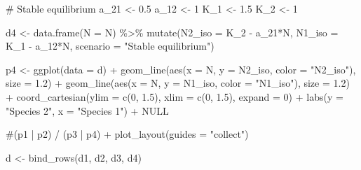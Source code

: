 \documentclass[
  letterpaper,
  DIV=11,
  numbers=noendperiod]{scrartcl}
\newenvironment{Shaded}{\begin{snugshade}}{\end{snugshade}}
\newcommand{\AttributeTok}[1]{\textcolor[rgb]{0.40,0.45,0.13}{#1}}
\newcommand{\CommentTok}[1]{\textcolor[rgb]{0.37,0.37,0.37}{#1}}
\newcommand{\ConstantTok}[1]{\textcolor[rgb]{0.56,0.35,0.01}{#1}}
\newcommand{\DecValTok}[1]{\textcolor[rgb]{0.68,0.00,0.00}{#1}}
\newcommand{\FloatTok}[1]{\textcolor[rgb]{0.68,0.00,0.00}{#1}}
\newcommand{\FunctionTok}[1]{\textcolor[rgb]{0.28,0.35,0.67}{#1}}
\newcommand{\NormalTok}[1]{\textcolor[rgb]{0.00,0.23,0.31}{#1}}
\newcommand{\OtherTok}[1]{\textcolor[rgb]{0.00,0.23,0.31}{#1}}
\newcommand{\SpecialCharTok}[1]{\textcolor[rgb]{0.37,0.37,0.37}{#1}}
\newcommand{\StringTok}[1]{\textcolor[rgb]{0.13,0.47,0.30}{#1}}
\begin{document}
\begin{Shaded}
\begin{Highlighting}[]
\CommentTok{\# Stable equilibrium}
\NormalTok{a\_21 }\OtherTok{\textless{}{-}} \FloatTok{0.5}
\NormalTok{a\_12 }\OtherTok{\textless{}{-}} \DecValTok{1}
\NormalTok{K\_1 }\OtherTok{\textless{}{-}} \FloatTok{1.5}
\NormalTok{K\_2 }\OtherTok{\textless{}{-}} \DecValTok{1}

\NormalTok{d4 }\OtherTok{\textless{}{-}} \FunctionTok{data.frame}\NormalTok{(}\AttributeTok{N =}\NormalTok{ N) }\SpecialCharTok{\%\textgreater{}\%} 
  \FunctionTok{mutate}\NormalTok{(}\AttributeTok{N2\_iso =}\NormalTok{ K\_2 }\SpecialCharTok{{-}}\NormalTok{ a\_21}\SpecialCharTok{*}\NormalTok{N,}
         \AttributeTok{N1\_iso =}\NormalTok{ K\_1 }\SpecialCharTok{{-}}\NormalTok{ a\_12}\SpecialCharTok{*}\NormalTok{N,}
         \AttributeTok{scenario =} \StringTok{"Stable equilibrium"}\NormalTok{)}

\NormalTok{p4 }\OtherTok{\textless{}{-}} \FunctionTok{ggplot}\NormalTok{(}\AttributeTok{data =}\NormalTok{ d) }\SpecialCharTok{+}
  \FunctionTok{geom\_line}\NormalTok{(}\FunctionTok{aes}\NormalTok{(}\AttributeTok{x =}\NormalTok{ N, }\AttributeTok{y =}\NormalTok{ N2\_iso, }\AttributeTok{color =} \StringTok{"N2\_iso"}\NormalTok{), }\AttributeTok{size =} \FloatTok{1.2}\NormalTok{) }\SpecialCharTok{+}
  \FunctionTok{geom\_line}\NormalTok{(}\FunctionTok{aes}\NormalTok{(}\AttributeTok{x =}\NormalTok{ N, }\AttributeTok{y =}\NormalTok{ N1\_iso, }\AttributeTok{color =} \StringTok{"N1\_iso"}\NormalTok{), }\AttributeTok{size =} \FloatTok{1.2}\NormalTok{) }\SpecialCharTok{+}
  \FunctionTok{coord\_cartesian}\NormalTok{(}\AttributeTok{ylim =} \FunctionTok{c}\NormalTok{(}\DecValTok{0}\NormalTok{, }\FloatTok{1.5}\NormalTok{), }\AttributeTok{xlim =} \FunctionTok{c}\NormalTok{(}\DecValTok{0}\NormalTok{, }\FloatTok{1.5}\NormalTok{), }\AttributeTok{expand =} \DecValTok{0}\NormalTok{) }\SpecialCharTok{+}
  \FunctionTok{labs}\NormalTok{(}\AttributeTok{y =} \StringTok{"Species 2"}\NormalTok{, }\AttributeTok{x =} \StringTok{"Species 1"}\NormalTok{) }\SpecialCharTok{+}
  \ConstantTok{NULL}

\CommentTok{\#(p1 | p2) /  (p3 | p4) + plot\_layout(guides = "collect")}

\NormalTok{d }\OtherTok{\textless{}{-}} \FunctionTok{bind\_rows}\NormalTok{(d1, d2, d3, d4)}


\end{Highlighting}
\end{Shaded}
\end{document}
